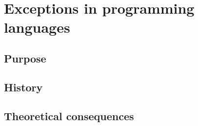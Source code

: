\chapter{Exceptions in programming languages}

\section{Purpose}

\section{History}

\section{Theoretical consequences}

